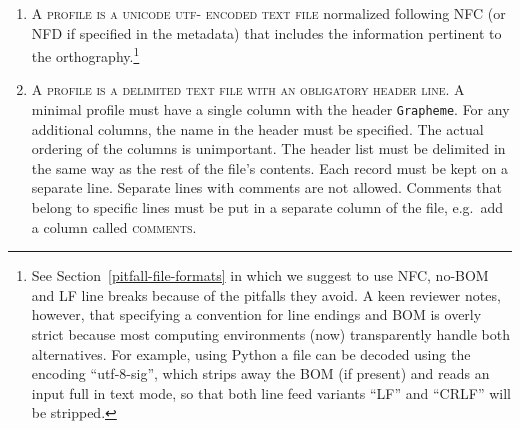\begin{enumerate}
	\def\labelenumi{A\arabic{enumi}.} 
	\item \textsc{A profile is a unicode utf-\scalebox{0.8}{8} encoded text file} 
	   normalized following NFC (or NFD if specified in the metadata)
       that includes the information pertinent to the orthography.\footnote{See 
	   Section~\ref{pitfall-file-formats} in which we suggest to use NFC, 
	   no-BOM and LF line breaks because of the pitfalls they avoid. A keen reviewer notes, however, that specifying 
	   a convention for line endings and BOM is overly strict because most 
	   computing environments (now) transparently handle both alternatives. 
	   For example, using Python a file can be decoded using the encoding 
	   ``utf-8-sig'', which strips away the BOM (if present) and reads 
	   an input full in text mode, so that both line feed variants ``LF'' and 
	   ``CRLF'' will be stripped.}

	\item \textsc{A profile is a delimited text file with an obligatory header
       line}. A minimal profile must have a single column with the header \texttt{Grapheme}. 
	   For any additional columns, the name in the header 
       must be specified. The actual ordering of the columns is unimportant. 
	   The header list must be delimited 
	   in the same way as the rest of the file's contents. Each record must be kept 
	   on a separate line. Separate lines with comments are not allowed. Comments that
       belong to specific lines must be put in a separate column of
       the file, e.g.~add a column called \textsc{comments}.

\begin{comment}	   
	\item \textsc{Metadata should be added in a separate utf-\scalebox{0.8}{8} text file} using a basic
       \textsc{tag: value} format. Metadata about the orthographic description
       given in the orthography profile includes, minimally, (i) author, (ii)
       date, (iii) title of the profile, (iv) a stable language identifier
       encoded in BCP 47/ISO 639-3 of the target language of the profile, and (v)
       bibliographic data for resource(s) that illustrate the orthography
       described in the profile. Further, (vi) the tokenization method and (vii)
       the unicode normalization used should be documented here (see below).
\end{comment}


\end{enumerate}
